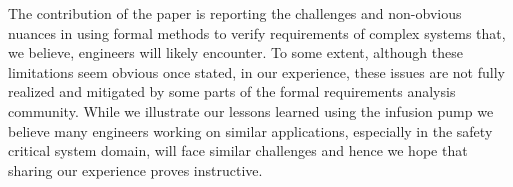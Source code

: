 The contribution of the paper is reporting the challenges and non-obvious nuances in using formal methods to verify requirements of complex systems that, we believe, engineers will likely encounter. To some extent, although these limitations seem obvious once stated, in our experience, these issues are not fully realized and mitigated by some parts of the formal requirements analysis community. While we illustrate our lessons learned using the infusion pump we believe many engineers working on similar applications, especially in the safety critical system domain, will face similar challenges and hence we hope that sharing our experience proves instructive.



\iffalse

